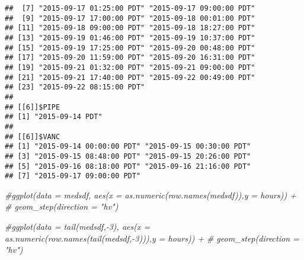 \documentclass[]{article}
\newenvironment{Shaded}{\begin{snugshade}}{\end{snugshade}}
\newcommand{\CommentTok}[1]{\textcolor[rgb]{0.56,0.35,0.01}{\textit{#1}}}
\begin{document}
\begin{verbatim}
##  [7] "2015-09-17 01:25:00 PDT" "2015-09-17 09:00:00 PDT"
##  [9] "2015-09-17 17:00:00 PDT" "2015-09-18 00:01:00 PDT"
## [11] "2015-09-18 09:00:00 PDT" "2015-09-18 18:27:00 PDT"
## [13] "2015-09-19 01:46:00 PDT" "2015-09-19 10:37:00 PDT"
## [15] "2015-09-19 17:25:00 PDT" "2015-09-20 00:48:00 PDT"
## [17] "2015-09-20 11:59:00 PDT" "2015-09-20 16:31:00 PDT"
## [19] "2015-09-21 01:32:00 PDT" "2015-09-21 09:00:00 PDT"
## [21] "2015-09-21 17:40:00 PDT" "2015-09-22 00:49:00 PDT"
## [23] "2015-09-22 08:15:00 PDT"
## 
## [[6]]$PIPE
## [1] "2015-09-14 PDT"
## 
## [[6]]$VANC
## [1] "2015-09-14 00:00:00 PDT" "2015-09-15 00:30:00 PDT"
## [3] "2015-09-15 08:48:00 PDT" "2015-09-15 20:26:00 PDT"
## [5] "2015-09-16 08:18:00 PDT" "2015-09-16 21:16:00 PDT"
## [7] "2015-09-17 09:00:00 PDT"
\end{verbatim}

\begin{Shaded}
\begin{Highlighting}[]
\CommentTok{#ggplot(data = medsdf, aes(x = as.numeric(row.names(medsdf)),y = hours)) + }
\CommentTok{#  geom_step(direction = "hv")}
\end{Highlighting}
\end{Shaded}

\begin{Shaded}
\begin{Highlighting}[]
\CommentTok{#ggplot(data = tail(medsdf,-3), aes(x = as.numeric(row.names(tail(medsdf,-3))),y = hours)) + }
\CommentTok{#  geom_step(direction = "hv")}
\end{Highlighting}
\end{Shaded}
\end{document}

